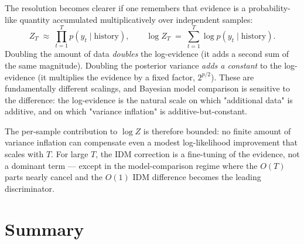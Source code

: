 \documentclass[11pt]{article}
\begin{document}
The resolution becomes clearer if one remembers that evidence is a probability-like quantity accumulated multiplicatively over independent samples:
\begin{equation}
Z_T \;\approx\; \prod_{t=1}^T p(y_t \mid \text{history}),
\qquad
\log Z_T \;=\; \sum_{t=1}^T \log p(y_t \mid \text{history}).
\end{equation}
Doubling the amount of data \emph{doubles} the log-evidence (it adds a second sum of the same magnitude). Doubling the posterior variance \emph{adds a constant} to the log-evidence (it multiplies the evidence by a fixed factor, $2^{p/2}$). These are fundamentally different scalings, and Bayesian model comparison is sensitive to the difference: the log-evidence is the natural scale on which "additional data" is additive, and on which "variance inflation" is additive-but-constant.

The per-sample contribution to $\log Z$ is therefore bounded: no finite amount of variance inflation can compensate even a modest log-likelihood improvement that scales with $T$. For large $T$, the IDM correction is a fine-tuning of the evidence, not a dominant term --- except in the model-comparison regime where the $O(T)$ parts nearly cancel and the $O(1)$ IDM difference becomes the leading discriminator.

\section{Summary}
\end{document}
